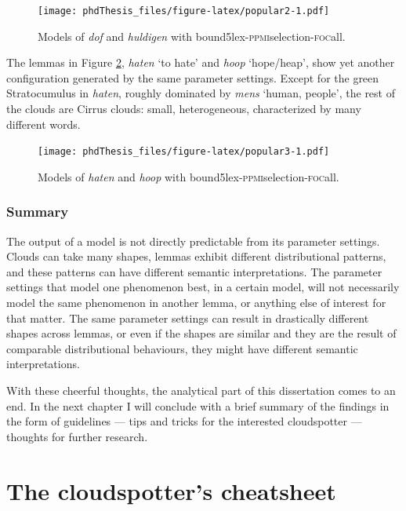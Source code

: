 \documentclass[
]{book}
\begin{document}
\begin{figure}
\centering
\texttt{[image: phdThesis\_files/figure-latex/popular2-1.pdf]}
\caption{\label{fig:popular2}Models of \emph{dof} and \emph{huldigen} with bound5lex-\textsc{ppmi}selection-\textsc{foc}all.}
\end{figure}

The lemmas in Figure \ref{fig:popular3}, \emph{haten} `to hate' and \emph{hoop} `hope/heap', show yet another configuration generated by the same parameter settings. Except for the green Stratocumulus in \emph{haten}, roughly dominated by \emph{mens} `human, people', the rest of the clouds are Cirrus clouds: small, heterogeneous, characterized by many different words.



\begin{figure}
\centering
\texttt{[image: phdThesis\_files/figure-latex/popular3-1.pdf]}
\caption{\label{fig:popular3}Models of \emph{haten} and \emph{hoop} with bound5lex-\textsc{ppmi}selection-\textsc{foc}all.}
\end{figure}

\hypertarget{theo3-summary}{%
\section{Summary}\label{theo3-summary}}

The output of a model is not directly predictable from its parameter settings. Clouds can take many shapes, lemmas exhibit different distributional patterns, and these patterns can have different semantic interpretations. The parameter settings that model one phenomenon best, in a certain model, will not necessarily model the same phenomenon in another lemma, or anything else of interest for that matter.
The same parameter settings can result in drastically different shapes across lemmas, or even if the shapes are similar and they are the result of comparable distributional behaviours, they might have different semantic interpretations.

With these cheerful thoughts, the analytical part of this dissertation comes to an end. In the next chapter I will conclude with a brief summary of the findings in the form of guidelines --- tips and tricks for the interested cloudspotter --- thoughts for further research.

\hypertarget{part-the-cloudspotters-cheatsheet}{%
\part{The cloudspotter's cheatsheet}\label{part-the-cloudspotters-cheatsheet}}
\end{document}
